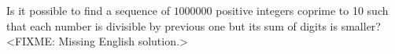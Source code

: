 \problem
Is it possible to find a sequence of $1000000$ positive integers coprime to
10 such that each number is divisible by previous one but its sum of digits is
smaller?
\solution
<FIXME: Missing English solution.>
\endproblem
